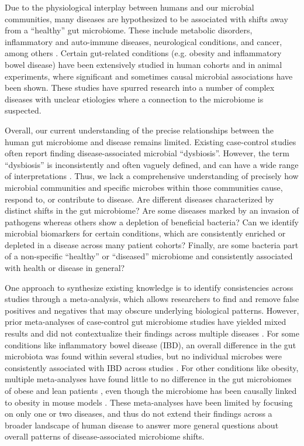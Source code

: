 Due to the physiological interplay between humans and our microbial communities, many diseases are hypothesized to be associated with shifts away from a ``healthy'' gut microbiome.
These include metabolic disorders, inflammatory and auto-immune diseases, neurological conditions, and cancer, among others \cite{nash-baker, turnbaugh2006obesity, asd-son, crc-zhao, par-schep}.
Certain gut-related conditions (e.g. obesity and inflammatory bowel disease) have been extensively studied in human cohorts and in animal experiments, where significant and sometimes causal microbial associations have been shown.
These studies have spurred research into a number of complex diseases with unclear etiologies where a connection to the microbiome is suspected.

Overall, our current understanding of the precise relationships between the human gut microbiome and disease remains limited.
Existing case-control studies often report finding disease-associated microbial ``dysbiosis''.
However, the term ``dysbiosis'' is inconsistently and often vaguely defined, and can have a wide range of interpretations \cite{olesen2016dysbiosis,zaneveld2017karenina}.
Thus, we lack a comprehensive understanding of precisely how microbial communities and specific microbes within those communities cause, respond to, or contribute to disease.
Are different diseases characterized by distinct shifts in the gut microbiome?
Are some diseases marked by an invasion of pathogens whereas others show a depletion of beneficial bacteria?
Can we identify microbial biomarkers for certain conditions, which are consistently enriched or depleted in a disease across many patient cohorts?
Finally, are some bacteria part of a non-specific ``healthy'' or ``diseased'' microbiome and consistently associated with health or disease in general?

One approach to synthesize existing knowledge is to identify consistencies across studies through a meta-analysis, which allows researchers to find and remove false positives and negatives that may obscure underlying biological patterns.
However, prior meta-analyses of case-control gut microbiome studies have yielded mixed results and did not contextualize their findings across multiple diseases \cite{walters2014meta, Sze07092016,finucane2014obesity}.
For some conditions like inflammatory bowel disease (IBD), an overall difference in the gut microbiota was found within several studies, but no individual microbes were consistently associated with IBD across studies \cite{walters2014meta}.
For other conditions like obesity, multiple meta-analyses have found little to no difference in the gut microbiomes of obese and lean patients \cite{walters2014meta,Sze07092016,finucane2014obesity}, even though the microbiome has been causally linked to obesity in mouse models \cite{turnbaugh2006obesity, ridaura2013gut}.
These meta-analyses have been limited by focusing on only one or two diseases, and thus do not extend their findings across a broader landscape of human disease to answer more general questions about overall patterns of disease-associated microbiome shifts.

